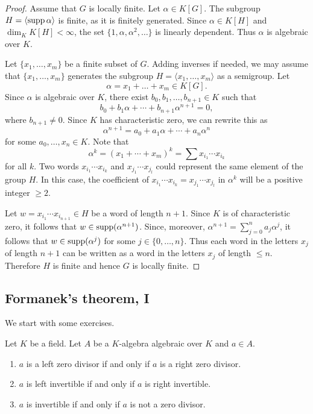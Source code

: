 \begin{proof}
	Assume that $G$ is locally finite. Let $\alpha\in K[G]$. The subgroup 
	$H=\langle\operatorname{supp}\alpha\rangle$ is finite, as it is finitely generated. Since 
	$\alpha\in K[H]$ and $\dim_KK[H]<\infty$, the set 
	$\{1,\alpha,\alpha^2,\dots\}$ is linearly dependent. Thus $\alpha$ is
	algebraic over $K$.

	Let $\{x_1,\dots,x_m\}$ be a finite subset of $G$. Adding inverses if needed,
	we may assume that $\{x_1,\dots,x_m\}$ generates the subgroup 
	$H=\langle x_1,\dots,x_m\rangle$ as a semigroup. Let 
	\[
	\alpha=x_1+\dots+x_m\in K[G].
	\]
	Since $\alpha$ is algebraic over $K$, 
	there exist $b_0,b_1,\dots,b_{n+1}\in K$ such that 
	\[
	b_0+b_1\alpha+\cdots+b_{n+1}\alpha^{n+1}=0,
	\]
	where $b_{n+1}\ne 0$. Since $K$ has characteristic zero, we can rewrite this as 
	\[
		\alpha^{n+1}=a_0+a_1\alpha+\cdots+a_n\alpha^n
	\]
	for some $a_0,\dots,x_n\in K$. 
	Note that 
	\[
		\alpha^{k}=(x_1+\cdots+x_m)^{k}
		=\sum x_{i_1}\cdots x_{i_{k}}
	\]
	for all $k$. 
	Two words $x_{i_1}\cdots x_{i_{k}}$ and 
	$x_{j_1}\cdots x_{j_{l}}$ could represent the same element of the group $H$. In this case, 
	the coefficient of $x_{i_1}\cdots x_{i_{k}}=x_{j_1}\cdots x_{j_{l}}$ 
	in $\alpha^{k}$ will be a positive integer $\geq2$. 
 
        Let $w=x_{i_1}\cdots
	x_{i_{n+1}}\in H$ be a word of length $n+1$. 
		Since $K$
	is of characteristic zero, it follows that $w\in\operatorname{supp}(\alpha^{n+1})$. Since, moreover,  
	$\alpha^{n+1}=\sum_{j=0}^na_j\alpha^j$, it follows that 
	$w\in\operatorname{supp}(\alpha^j)$ for some $j\in\{0,\dots,n\}$. Thus each
	word in the letters $x_j$ of length $n+1$ can be written as a word in the letters $x_j$ of 
	length $\leq n$. Therefore $H$ is finite and hence $G$ is locally finite. 
\end{proof}

\subsection{Formanek's theorem, I}

We start with some exercises. 

\begin{exercise}
\label{xca:invertible_algebraic}
	Let $K$ be a field. Let $A$ be a $K$-algebra algebraic over $K$ and $a\in A$.
	\begin{enumerate}
		\item $a$ is a left zero divisor if and only if $a$ is a right zero divisor.
		\item $a$ is left invertible if and only if $a$ is right invertible.
		\item $a$ is invertible if and only if $a$ is not a zero divisor.
	\end{enumerate}
\end{exercise}


